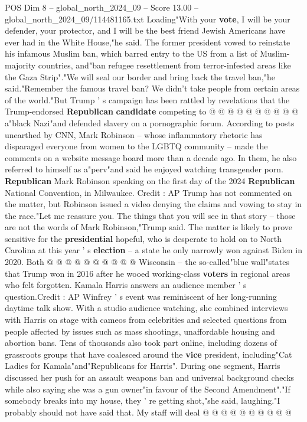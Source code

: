 \begin{textsample}{POS Dim 8 – global\_north\_2024\_09 – Score 13.00 – global\_north\_2024\_09/114481165.txt}
Loading"With your \textbf{vote}, I will be your defender, your protector, and I will be the best friend Jewish Americans have ever had in the White House,"he said.
The former president vowed to reinstate his infamous Muslim ban, which barred entry to the US from a list of Muslim-majority countries, and"ban refugee resettlement from terror-infested areas like the Gaza Strip"."We will seal our border and bring back the travel ban,"he said."Remember the famous travel ban?
We didn't take people from certain areas of the world."But Trump ' s campaign has been rattled by revelations that the Trump-endorsed \textbf{Republican} \textbf{candidate} competing to @ @ @ @ @ @ @ @ @ @ a"black Nazi"and defended slavery on a pornographic forum.
According to posts unearthed by CNN, Mark Robinson -- whose inflammatory rhetoric has disparaged everyone from women to the LGBTQ community -- made the comments on a website message board more than a decade ago.
In them, he also referred to himself as a"perv"and said he enjoyed watching transgender porn. \textbf{Republican} Mark Robinson speaking on the first day of the 2024 \textbf{Republican} National Convention, in Milwaukee.
Credit : AP Trump has not commented on the matter, but Robinson issued a video denying the claims and vowing to stay in the race."Let me reassure you.
The things that you will see in that story -- those are not the words of Mark Robinson,"Trump said.
The matter is likely to prove sensitive for the \textbf{presidential} hopeful, who is desperate to hold on to North Carolina at this year ' s \textbf{election} -- a state he only narrowly won against Biden in 2020.
Both @ @ @ @ @ @ @ @ @ @ Wisconsin -- the so-called"blue wall"states that Trump won in 2016 after he wooed working-class \textbf{voters} in regional areas who felt forgotten.
Kamala Harris answers an audience member ' s question.Credit : AP Winfrey ' s event was reminiscent of her long-running daytime talk show.
With a studio audience watching, she combined interviews with Harris on stage with cameos from celebrities and selected questions from people affected by issues such as mass shootings, unaffordable housing and abortion bans.
Tens of thousands also took part online, including dozens of grassroots groups that have coalesced around the \textbf{vice} president, including"Cat Ladies for Kamala"and"Republicans for Harris".
During one segment, Harris discussed her push for an assault weapons ban and universal background checks while also saying she was a gun owner"in favour of the Second Amendment"."If somebody breaks into my house, they ' re getting shot,"she said, laughing."I probably should not have said that.
My staff will deal @ @ @ @ @ @ @ @ @ @

\end{textsample}
